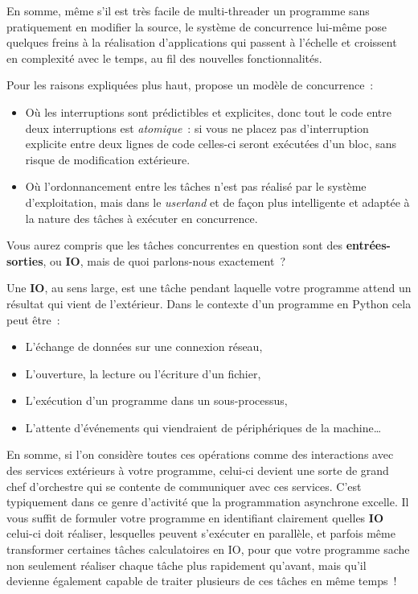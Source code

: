 \documentclass[small]{zmdocument}
\begin{document}
En somme, même s’il est très facile de multi-threader un programme sans pratiquement en modifier la source, le système de concurrence lui-même pose quelques freins à la réalisation d’applications qui passent à l’échelle et croissent en complexité avec le temps, au fil des nouvelles fonctionnalités.





Pour les raisons expliquées plus haut,  propose un modèle de concurrence :



\begin{itemize}
\item\relax Où les interruptions sont prédictibles et explicites, donc tout le code entre deux interruptions est \textit{atomique} : si vous ne placez pas d’interruption explicite entre deux lignes de code celles-ci seront exécutées d’un bloc, sans risque de modification extérieure.
\item\relax Où l’ordonnancement entre les tâches n’est pas réalisé par le système d’exploitation, mais dans le \textit{userland} et de façon plus intelligente et adaptée à la nature des tâches à exécuter en concurrence.
\end{itemize}


Vous aurez compris que les tâches concurrentes en question sont des \textbf{entrées-sorties}, ou \textbf{IO}, mais de quoi parlons-nous exactement ?



Une \textbf{IO}, au sens large, est une tâche pendant laquelle votre programme attend un résultat qui vient de l’extérieur. Dans le contexte d’un programme en Python cela peut être :



\begin{itemize}
\item\relax L’échange de données sur une connexion réseau,
\item\relax L’ouverture, la lecture ou l’écriture d’un fichier,
\item\relax L’exécution d’un programme dans un sous-processus,
\item\relax L’attente d’événements qui viendraient de périphériques de la machine…
\end{itemize}


En somme, si l’on considère toutes ces opérations comme des interactions avec des services extérieurs à votre programme, celui-ci devient une sorte de grand chef d’orchestre qui se contente de communiquer avec ces services. C’est typiquement dans ce genre d’activité que la programmation asynchrone excelle. Il vous suffit de formuler votre programme en identifiant clairement quelles \textbf{IO} celui-ci doit réaliser, lesquelles peuvent s’exécuter en parallèle, et parfois même transformer certaines tâches calculatoires en IO, pour que votre programme sache non seulement réaliser chaque tâche plus rapidement qu’avant, mais qu’il devienne également capable de traiter plusieurs de ces tâches en même temps !
\end{document}

